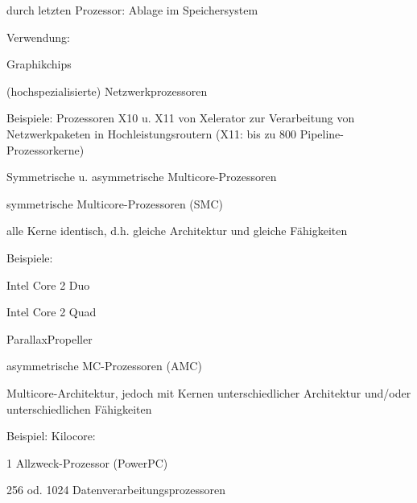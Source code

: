 \documentclass[a4paper]{article}
\begin{document}
\begin{multicols}{3}
\begin{itemize*}
\begin{itemize*}
            \item durch letzten Prozessor: Ablage im Speichersystem
            \item Verwendung: \begin{itemize*} \item Graphikchips \item (hochspezialisierte) Netzwerkprozessoren \end{itemize*}
            \item Beispiele: Prozessoren X10 u. X11 von Xelerator zur Verarbeitung von Netzwerkpaketen in Hochleistungsroutern (X11: bis zu 800 Pipeline-Prozessorkerne)
        \end{itemize*}
    \end{itemize*}

    Symmetrische u. asymmetrische Multicore-Prozessoren

    \begin{itemize*}
        \item
        symmetrische Multicore-Prozessoren (SMC)
        \begin{itemize*}
            \item alle Kerne identisch, d.h. gleiche Architektur und gleiche Fähigkeiten
            \item Beispiele: \begin{itemize*} \item Intel Core 2 Duo \item Intel Core 2 Quad \item ParallaxPropeller \end{itemize*}
        \end{itemize*}
        \item
        asymmetrische MC-Prozessoren (AMC)
        \item
        Multicore-Architektur, jedoch mit Kernen unterschiedlicher Architektur
        und/oder unterschiedlichen Fähigkeiten
        \item
        Beispiel: Kilocore:
        \begin{itemize*}
            \item 1 Allzweck-Prozessor (PowerPC)
            \item \begin{itemize*} \item 256 od. 1024 Datenverarbeitungsprozessoren \end{itemize*}
        \end{itemize*}
    \end{itemize*}



\end{multicols}
\end{document}
